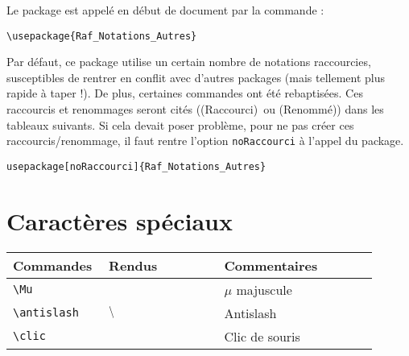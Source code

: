\documentclass[a4paper,12pt]{article}
\newcommand{\rac}{({\color{red}Raccourci})}
\newcommand{\ren}{({\color{blue}Renommé})}
\begin{document}
		Le package est appelé en début de document par la commande :
		\begin{verbatim}
\usepackage{Raf_Notations_Autres}
		\end{verbatim}

		Par défaut, ce package utilise un certain nombre de notations raccourcies, susceptibles de rentrer en conflit avec d'autres packages (mais tellement plus rapide à taper !).
		De plus, certaines commandes ont été rebaptisées.
		Ces raccourcis et renommages seront cités (\rac\ ou \ren) dans les tableaux suivants.
		Si cela devait poser problème, pour ne pas créer ces raccourcis/renommage, il faut rentre l'option \verb!noRaccourci! à l'appel du package.

		\begin{verbatim}
usepackage[noRaccourci]{Raf_Notations_Autres}
		\end{verbatim}

	\section{Caractères spéciaux}
		\noindent
		\begin{tabular}{|p{0.2\linewidth}|p{0.3\linewidth}|p{0.4\linewidth}|}
			\hline
				\textbf{Commandes}&\textbf{Rendus}&\textbf{Commentaires}
			\\\hline\hline
				\verb!\Mu!	&	\Mu	&	$\mu$ majuscule
			\\\hline
				\verb!\antislash!	&	$\backslash$	&	Antislash
			\\\hline
				\verb!\clic!	&	\clic	&	Clic de souris
			\\\hline
		\end{tabular}	
\end{document}
